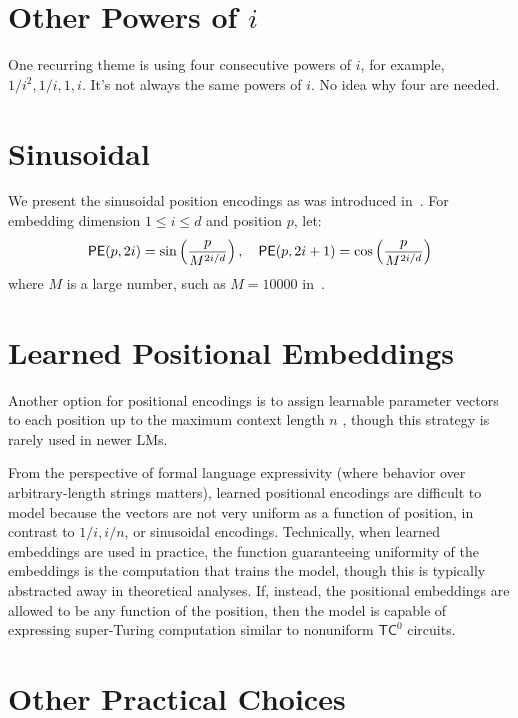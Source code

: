 \section{Other Powers of $i$}

One recurring theme is using four consecutive powers of $i$, for example, $1/i^2, 1/i, 1, i$. It's not always the same powers of $i$. No idea why four are needed.


\section{Sinusoidal}

We present the sinusoidal position encodings as was introduced in~\citep{vaswani-etal-2017-attention}.
For embedding dimension \(1 \leq i \leq d\) and position \(p\), let:
\begin{align*}
    \mathsf{PE}(p, 2i) = \sin\left(\frac{p}{M^{2i/d}}\right),
    \quad
    \mathsf{PE}(p, 2i+1) = \cos\left(\frac{p}{M^{2i/d}}\right)
\end{align*}
where \(M\) is a large number, such as \(M = 10000\) in~\citep{vaswani-etal-2017-attention}.


\section{Learned Positional Embeddings}

Another option for positional encodings is to assign learnable parameter vectors to each position up to the maximum context length $n$ \citep{vaswani-etal-2017-attention}, though this strategy is rarely used in newer LMs.

From the perspective of formal language expressivity (where behavior over arbitrary-length strings matters), learned positional encodings are difficult to model because the vectors are not very uniform as a function of position, in contrast to $1/i, i/n$, or sinusoidal encodings.
Technically, when learned embeddings are used in practice, the function guaranteeing uniformity of the embeddings is the computation that trains the model, though this is typically abstracted away in theoretical analyses.
If, instead, the positional embeddings are allowed to be any function of the position, then the model is capable of expressing super-Turing computation similar to nonuniform $\mathsf{TC}^0$ circuits.

\section{Other Practical Choices}

